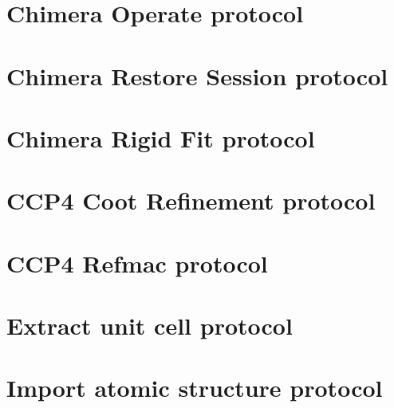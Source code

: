 \documentclass[12pt, draft]{article} %
\begin{document}
\tableofcontents %

\newpage %






















\begin{appendices}


\section{Chimera Operate protocol}
\label{app:chimeraOperate}

\section{Chimera Restore Session protocol}
\label{app:chimeraRestoreSession}

\section{Chimera Rigid Fit protocol}
\label{app:chimeraRigidFit}

\section{CCP4 Coot Refinement protocol}
\label{app:ccp4CootRefinement}

\section{CCP4 Refmac protocol}
\label{app:ccp4Refmac}

\section{Extract unit cell protocol}
\label{app:extractUnitCell}

\section{Import atomic structure protocol}
\label{app:importAtomicStructure}


\end{appendices}
\end{document}
